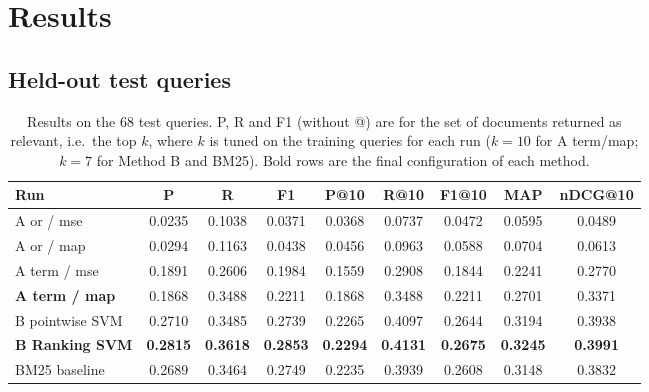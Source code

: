 \documentclass[11pt,a4paper]{article}
\begin{document}
\section{Results}

\subsection{Held-out test queries}

\begin{table}[H]
\centering
\small
\begin{tabular}{lcccccccc}
\toprule
\textbf{Run} & \textbf{P} & \textbf{R} & \textbf{F1} & \textbf{P@10} & \textbf{R@10} & \textbf{F1@10} & \textbf{MAP} & \textbf{nDCG@10} \\
\midrule
A or / mse            & 0.0235 & 0.1038 & 0.0371 & 0.0368 & 0.0737 & 0.0472 & 0.0595 & 0.0489 \\
A or / map            & 0.0294 & 0.1163 & 0.0438 & 0.0456 & 0.0963 & 0.0588 & 0.0704 & 0.0613 \\
A term / mse          & 0.1891 & 0.2606 & 0.1984 & 0.1559 & 0.2908 & 0.1844 & 0.2241 & 0.2770 \\
\textbf{A term / map} & 0.1868 & 0.3488 & 0.2211 & 0.1868 & 0.3488 & 0.2211 & 0.2701 & 0.3371 \\
\midrule
B pointwise SVM       & 0.2710 & 0.3485 & 0.2739 & 0.2265 & 0.4097 & 0.2644 & 0.3194 & 0.3938 \\
\textbf{B Ranking SVM}& \textbf{0.2815} & \textbf{0.3618} & \textbf{0.2853} & \textbf{0.2294} & \textbf{0.4131} & \textbf{0.2675} & \textbf{0.3245} & \textbf{0.3991} \\
\midrule
BM25 baseline         & 0.2689 & 0.3464 & 0.2749 & 0.2235 & 0.3939 & 0.2608 & 0.3148 & 0.3832 \\
\bottomrule
\end{tabular}
\caption{Results on the 68 test queries. P, R and F1 (without @) are for the set of
documents returned as relevant, i.e.\ the top $k$, where $k$ is tuned on the training
queries for each run ($k=10$ for A term/map; $k=7$ for Method B and BM25). Bold rows are
the final configuration of each method.}
\label{tab:test}
\end{table}
\end{document}
